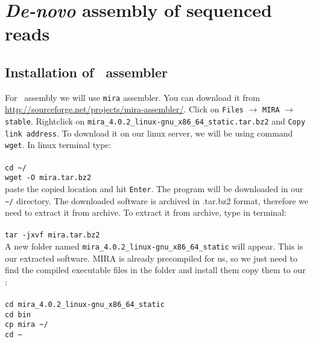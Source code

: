 \section{\textit{De-novo} assembly of sequenced reads}
\subsection{Installation of \denovo~assembler}
For \denovo~assembly we will use \texttt{mira} assembler.
You can download it from \url{http://sourceforge.net/projects/mira-assembler/}.
Click on \texttt{Files} $\rightarrow$ \texttt{MIRA} $\rightarrow$ \texttt{stable}. Rightclick on \texttt{mira\_4.0.2\_linux-gnu\_x86\_64\_static.tar.bz2}
and \texttt{Copy link address}.
To download it on our linux server, we will be using command \texttt{wget}. In linux terminal type: \\~\\
\texttt{cd \textasciitilde/\progDir} \\
\texttt{wget -O mira.tar.bz2} \\

paste the copied location and hit \texttt{Enter}.
The program will be downloaded in our \texttt{\textasciitilde/\progDir} directory. 
The downloaded software is archived in .tar.bz2 format, therefore we need to extract it from archive.
To extract it from archive, type in terminal:\\~\\
\texttt{tar -jxvf mira.tar.bz2}\\

A new folder named \texttt{mira\_4.0.2\_linux-gnu\_x86\_64\_static} will appear.
This is our extracted software.
MIRA is already precompiled for us, so we just need
to find the compiled executable files in the folder and install them copy them to our \binDir: \\~\\
\texttt{cd mira\_4.0.2\_linux-gnu\_x86\_64\_static} \\
\texttt{cd bin} \\
\texttt{cp mira \textasciitilde/\binDir} \\
\texttt{cd \textasciitilde} \\

